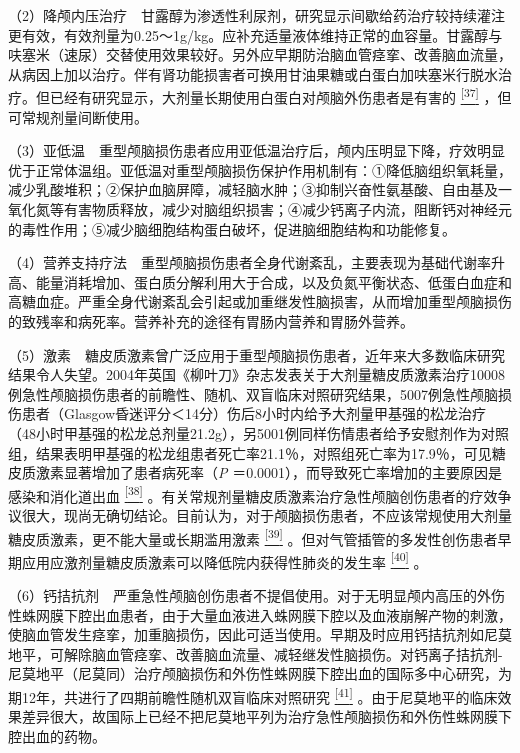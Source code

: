 （2）降颅内压治疗　甘露醇为渗透性利尿剂，研究显示间歇给药治疗较持续灌注更有效，有效剂量为0.25～1g/kg。应补充适量液体维持正常的血容量。甘露醇与呋塞米（速尿）交替使用效果较好。另外应早期防治脑血管痉挛、改善脑血流量，从病因上加以治疗。伴有肾功能损害者可换用甘油果糖或白蛋白加呋塞米行脱水治疗。但已经有研究显示，大剂量长期使用白蛋白对颅脑外伤患者是有害的
\protect\hyperlink{text00024.htmlux5cux23ch37-23}{\textsuperscript{{[}37{]}}}
，但可常规剂量间断使用。

（3）亚低温　重型颅脑损伤患者应用亚低温治疗后，颅内压明显下降，疗效明显优于正常体温组。亚低温对重型颅脑损伤保护作用机制有：①降低脑组织氧耗量，减少乳酸堆积；②保护血脑屏障，减轻脑水肿；③抑制兴奋性氨基酸、自由基及一氧化氮等有害物质释放，减少对脑组织损害；④减少钙离子内流，阻断钙对神经元的毒性作用；⑤减少脑细胞结构蛋白破坏，促进脑细胞结构和功能修复。

（4）营养支持疗法　重型颅脑损伤患者全身代谢紊乱，主要表现为基础代谢率升高、能量消耗增加、蛋白质分解利用大于合成，以及负氮平衡状态、低蛋白血症和高糖血症。严重全身代谢紊乱会引起或加重继发性脑损害，从而增加重型颅脑损伤的致残率和病死率。营养补充的途径有胃肠内营养和胃肠外营养。

（5）激素　糖皮质激素曾广泛应用于重型颅脑损伤患者，近年来大多数临床研究结果令人失望。2004年英国《柳叶刀》杂志发表关于大剂量糖皮质激素治疗10008例急性颅脑损伤患者的前瞻性、随机、双盲临床对照研究结果，5007例急性颅脑损伤患者（Glasgow昏迷评分＜14分）伤后8小时内给予大剂量甲基强的松龙治疗（48小时甲基强的松龙总剂量21.2g），另5001例同样伤情患者给予安慰剂作为对照组，结果表明甲基强的松龙组患者死亡率21.1％，对照组死亡率为17.9％，可见糖皮质激素显著增加了患者病死率（\emph{P}
＝0.0001），而导致死亡率增加的主要原因是感染和消化道出血
\protect\hyperlink{text00024.htmlux5cux23ch38-23}{\textsuperscript{{[}38{]}}}
。有关常规剂量糖皮质激素治疗急性颅脑创伤患者的疗效争议很大，现尚无确切结论。目前认为，对于颅脑损伤患者，不应该常规使用大剂量糖皮质激素，更不能大量或长期滥用激素
\protect\hyperlink{text00024.htmlux5cux23ch39-23}{\textsuperscript{{[}39{]}}}
。但对气管插管的多发性创伤患者早期应用应激剂量糖皮质激素可以降低院内获得性肺炎的发生率
\protect\hyperlink{text00024.htmlux5cux23ch40-23}{\textsuperscript{{[}40{]}}}
。

（6）钙拮抗剂　严重急性颅脑创伤患者不提倡使用。对于无明显颅内高压的外伤性蛛网膜下腔出血患者，由于大量血液进入蛛网膜下腔以及血液崩解产物的刺激，使脑血管发生痉挛，加重脑损伤，因此可适当使用。早期及时应用钙拮抗剂如尼莫地平，可解除脑血管痉挛、改善脑血流量、减轻继发性脑损伤。对钙离子拮抗剂-尼莫地平（尼莫同）治疗颅脑损伤和外伤性蛛网膜下腔出血的国际多中心研究，为期12年，共进行了四期前瞻性随机双盲临床对照研究
\protect\hyperlink{text00024.htmlux5cux23ch41-23}{\textsuperscript{{[}41{]}}}
。由于尼莫地平的临床效果差异很大，故国际上已经不把尼莫地平列为治疗急性颅脑损伤和外伤性蛛网膜下腔出血的药物。

